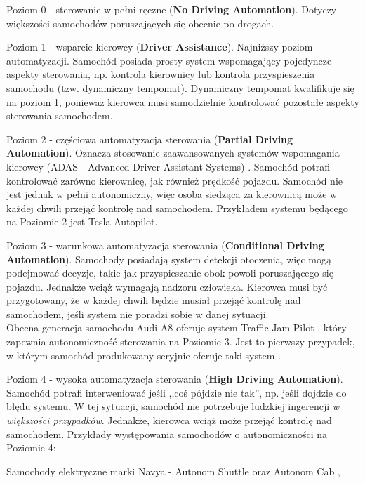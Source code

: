 \begin{enumerate*}
\item Poziom 0 - sterowanie w pełni ręczne (\textbf{No Driving Automation}). Dotyczy większości samochodów poruszających się obecnie po drogach.
\item Poziom 1 - wsparcie kierowcy (\textbf{Driver Assistance}). Najniższy poziom automatyzacji. Samochód posiada prosty system wspomagający pojedyncze aspekty sterowania, np. kontrola kierownicy lub kontrola przyspieszenia samochodu (tzw. dynamiczny tempomat). 
Dynamiczny tempomat kwalifikuje się na poziom 1, ponieważ kierowca musi samodzielnie kontrolować pozostałe aspekty sterowania samochodem.
\item Poziom 2 - częściowa automatyzacja sterowania (\textbf{Partial Driving Automation}). Oznacza stosowanie zaawansowanych systemów wspomagania kierowcy (ADAS - Advanced Driver Assistant Systems) \cite{adas:opis}. Samochód potrafi kontrolować zarówno kierownicę, jak również prędkość pojazdu. Samochód nie jest jednak w pełni autonomiczny, więc osoba siedząca za kierownicą może w każdej chwili przejąć kontrolę nad samochodem. Przykładem systemu będącego na Poziomie 2 jest Tesla Autopilot.
\item Poziom 3 - warunkowa automatyzacja sterowania (\textbf{Conditional Driving Automation}). Samochody posiadają system detekcji otoczenia, więc mogą podejmować decyzje, takie jak przyspieszanie obok powoli poruszającego się pojazdu. Jednakże wciąż wymagają nadzoru człowieka. Kierowca musi być przygotowany, że w każdej chwili będzie musiał przejąć kontrolę nad samochodem, jeśli system nie poradzi sobie w danej sytuacji. \\
Obecna generacja samochodu Audi A8 oferuje system Traffic Jam Pilot \cite{audi:trafficJamPilot}, który zapewnia autonomiczność sterowania na Poziomie 3. Jest to pierwszy przypadek, w którym samochód produkowany seryjnie oferuje taki system \cite{audi:newAudiA8ConditionalAutomated}.
\item Poziom 4 - wysoka automatyzacja sterowania (\textbf{High Driving Automation}). Samochód potrafi interweniować jeśli ,,coś pójdzie nie tak'', np. jeśli dojdzie do błędu systemu. W tej sytuacji, samochód nie potrzebuje ludzkiej ingerencji \textit{w większości przypadków}. Jednakże, kierowca wciąż może przejąć kontrolę nad samochodem. Przykłady występowania samochodów o autonomiczności na Poziomie 4:
\begin{itemize*}
\item Samochody elektryczne marki Navya - Autonom Shuttle oraz Autonom Cab \cite{motorAuthority:navyaCars},

\end{itemize*}
\end{enumerate*}
